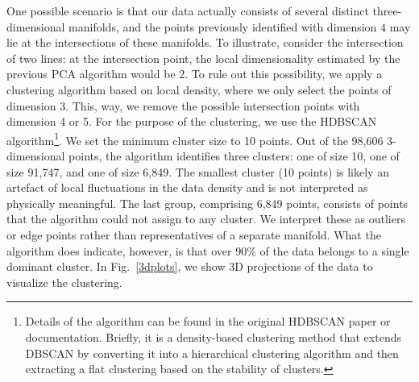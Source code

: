 \documentclass[11pt]{article}
\begin{document}
		One possible scenario is that our data actually consists of several distinct three-dimensional manifolds, and the points previously identified with dimension $4$ may lie at the intersections of these manifolds. To illustrate, consider the intersection of two lines: at the intersection point, the local dimensionality estimated by the previous PCA algorithm would be 2. To rule out this possibility, we apply a clustering algorithm based on local density, where we only select the points of dimension 3. This, way, we remove the possible intersection points with dimension 4 or 5. For the purpose of the clustering, we use the HDBSCAN algorithm\footnote{Details of the algorithm can be found in the original HDBSCAN paper or documentation. Briefly, it is a density-based clustering method that extends DBSCAN by converting it into a hierarchical clustering algorithm and then extracting a flat clustering based on the stability of clusters.}.
		We set the minimum cluster size to 10 points. Out of the 98,606 3-dimensional points, the algorithm identifies three clusters: one of size 10, one of size 91,747, and one of size 6,849. 
		The smallest cluster (10 points) is likely an artefact of local fluctuations in the data density and is not interpreted as physically meaningful. The last group, comprising 6,849 points, consists of points that the algorithm could not assign to any cluster. We interpret these as outliers or edge points rather than representatives of a separate manifold.
		What the algorithm does indicate, however, is that over 90\% of the data belongs to a single dominant cluster. In Fig.~\ref{3dplots}, we show 3D projections of the data to visualize the clustering. 
\end{document}
